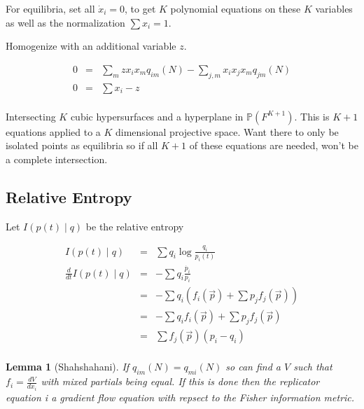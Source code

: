 \documentclass[11pt]{book}
\theoremstyle{change}
\newtheorem{lemma}[equation]{Lemma}
\theoremstyle{nonumberplain}
\numberwithin{equation}{section}
\begin{document}
For equilibria, set all $\dot{x}_i = 0$, to get $K$ polynomial equations on these $K$ variables as well as the normalization $\sum x_i = 1$.

Homogenize with an additional variable $z$.

\begin{eqnarray*}
0 &=& \sum_m z x_i x_m q_{im} (N) - \sum_{j,m} x_i x_j x_m q_{jm} (N)\\
0 &=& \sum x_i - z\\
\end{eqnarray*}

Intersecting $K$ cubic hypersurfaces and a hyperplane in $\mathbb{P}(F^{K+1})$. This is $K+1$ equations applied to a $K$ dimensional projective space. Want there to only be isolated points as equilibria so if all $K+1$ of these equations are needed, won't be a complete intersection.

\subsection{Relative Entropy}

Let $I (p(t) \mid q)$ be the relative entropy

\begin{eqnarray*}
I(p(t) \mid q) &=& \sum q_i \log \frac{ q_i}{p_i (t)}\\
\frac{d}{dt} I(p(t) \mid q) &=& - \sum q_i \frac{\dot{p_i}}{p_i}\\
&=& - \sum q_i ( f_i ( \vec{p} ) + \sum p_j f_j (\vec{p}) )\\
&=& - \sum q_i f_i (\vec{p}) + \sum p_j f_j (\vec{p})\\
&=& \sum f_j (\vec{p}) (p_i - q_i)\\
\end{eqnarray*}

\begin{lemma}[Shahshahani]
If $q_{im} (N) = q_{mi} (N)$ so can find a $V$ such that $f_i = \frac{dV}{dx_i}$ with mixed partials being equal. If this is done then the replicator equation i a gradient flow equation with repsect to the Fisher information metric.
\end{lemma}
\end{document}
